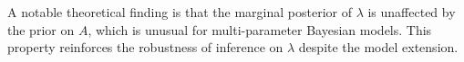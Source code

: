 A notable theoretical finding is that the marginal posterior of $\lambda$ is unaffected by the prior on $A$, which is unusual for multi-parameter Bayesian models. This property reinforces the robustness of inference on $\lambda$ despite the model extension.

